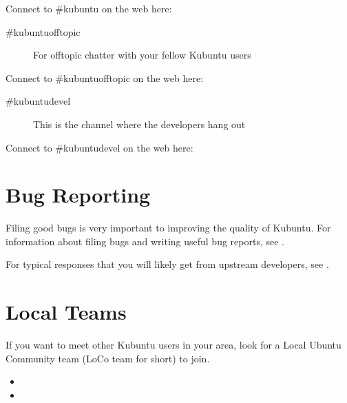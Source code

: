 \documentclass[letterpaper,10pt,english]{sphinxmanual}
\begin{document}
\sphinxAtStartPar
Connect to \#kubuntu on the web here: 
\begin{description}
\item[{\#kubuntu\sphinxhyphen{}offtopic}] \leavevmode
\sphinxAtStartPar
For off\sphinxhyphen{}topic chatter with your fellow Kubuntu users

\end{description}

\sphinxAtStartPar
Connect to \#kubuntu\sphinxhyphen{}offtopic on the web here: 
\begin{description}
\item[{\#kubuntu\sphinxhyphen{}devel}] \leavevmode
\sphinxAtStartPar
This is the channel where the developers hang out

\end{description}

\sphinxAtStartPar
Connect to \#kubuntu\sphinxhyphen{}devel on the web here: 


\section{Bug Reporting}
\label{\detokenize{docs/contribute:bug-reporting}}
\sphinxAtStartPar
Filing good bugs is very important to improving the quality of Kubuntu. For information about filing bugs and writing useful bug reports, see .

\sphinxAtStartPar
For typical responses that you will likely get from upstream  developers, see .


\section{Local Teams}
\label{\detokenize{docs/contribute:local-teams}}
\sphinxAtStartPar
If you want to meet other Kubuntu users in your area, look for a Local Ubuntu Community team (LoCo team for short) to join.
\begin{itemize}
\item {} 
\sphinxAtStartPar
{}

\item {} 
\sphinxAtStartPar
{}

\end{itemize}
\end{document}
